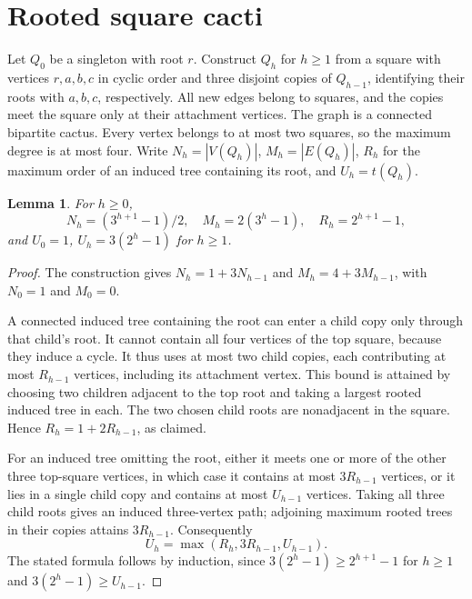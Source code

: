 \documentclass[11pt,a4paper]{article}
\newtheorem{lemma}[theorem]{Lemma}
\begin{document}
\section{Rooted square cacti}
Let $Q_0$ be a singleton with root $r$. Construct $Q_h$ for $h\ge1$ from a square with vertices $r,a,b,c$ in cyclic order and three disjoint copies of $Q_{h-1}$, identifying their roots with $a,b,c$, respectively. All new edges belong to squares, and the copies meet the square only at their attachment vertices. The graph is a connected bipartite cactus. Every vertex belongs to at most two squares, so the maximum degree is at most four. Write $N_h=|V(Q_h)|$, $M_h=|E(Q_h)|$, $R_h$ for the maximum order of an induced tree containing its root, and $U_h=t(Q_h)$.
\begin{lemma}
For $h\ge0$,
\[
 N_h=(3^{h+1}-1)/2,\quad M_h=2(3^h-1),\quad R_h=2^{h+1}-1,
\]
and $U_0=1$, $U_h=3(2^h-1)$ for $h\ge1$.
\end{lemma}
\begin{proof}
The construction gives $N_h=1+3N_{h-1}$ and $M_h=4+3M_{h-1}$, with $N_0=1$ and $M_0=0$.

A connected induced tree containing the root can enter a child copy only through that child's root. It cannot contain all four vertices of the top square, because they induce a cycle. It thus uses at most two child copies, each contributing at most $R_{h-1}$ vertices, including its attachment vertex. This bound is attained by choosing two children adjacent to the top root and taking a largest rooted induced tree in each. The two chosen child roots are nonadjacent in the square. Hence $R_h=1+2R_{h-1}$, as claimed.

For an induced tree omitting the root, either it meets one or more of the other three top-square vertices, in which case it contains at most $3R_{h-1}$ vertices, or it lies in a single child copy and contains at most $U_{h-1}$ vertices. Taking all three child roots gives an induced three-vertex path; adjoining maximum rooted trees in their copies attains $3R_{h-1}$. Consequently
\[
 U_h=\max(R_h,3R_{h-1},U_{h-1}).
\]
The stated formula follows by induction, since $3(2^h-1)\ge 2^{h+1}-1$ for $h\ge1$ and $3(2^h-1)\ge U_{h-1}$.
\end{proof}
\end{document}
